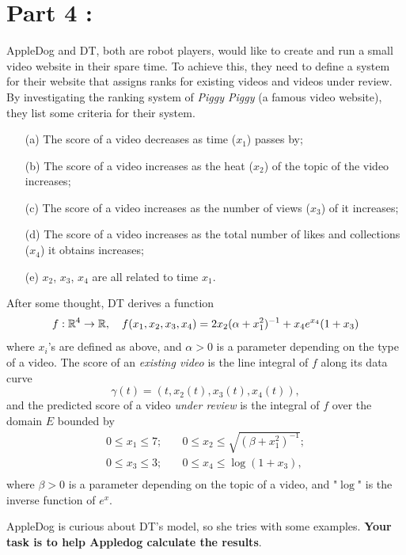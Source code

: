\documentclass[12pt]{article}
\renewcommand{\emph}[1]{{\color{Turquoise3}\textsl{#1}}}
\begin{document}
\section*{Part 4 : }
\par AppleDog and DT, both are robot players, would like to create and run a small video website in their spare time. To achieve this, they need to define a system for their website that assigns ranks for existing videos and videos under review. By investigating the ranking system of \textsl{Piggy Piggy} (a famous video website), they list some criteria for their system.
\begin{itemize}
    \item[(a)] The score of a video decreases as time (\emph{$x_1$}) passes by;
    \item[(b)] The score of a video increases as the heat (\emph{$x_2$}) of the topic of the video increases;
    \item[(c)] The score of a video increases as the number of views (\emph{$x_3$}) of it increases;
    \item[(d)] The score of a video increases as the total number of likes and collections (\emph{$x_4$}) it obtains increases;
    \item[(e)] $x_2$, $x_3$, $x_4$ are all related to time \emph{$x_1$}. 
\end{itemize}
\par After some thought, DT derives a function 
\begin{equation*}
    f:\mathbb{R}^4 \to \mathbb{R},\quad f(x_1, x_2, x_3, x_4) = 2 x_2(\alpha + x_1^2)^{-1} + x_4e^{x_4}(1 + x_3)
\end{equation*}
where $x_i$'s are defined as above, and $\alpha > 0$ is a parameter depending on the type of a video. The score of an \textsl{existing video} is the line integral of $f$ along its data curve
\begin{equation*}
    \gamma(t)=(t,x_2(t),x_3(t),x_4(t)), 
\end{equation*}
and the predicted score of a video \textsl{under review} is the integral of $f$ over the domain $E$ bounded by
\begin{equation*}
    \begin{split}
        0 \leq x_1\leq 7;& \quad 0 \leq x_2 \leq \sqrt{(\beta + x_1^2)^{-1}};\\
        0 \leq x_3 \leq 3;& \quad 0 \leq x_4 \leq \log(1 + x_3),\\ 
    \end{split}
\end{equation*}
where $\beta > 0$ is a parameter depending on the topic of a video, and "$\log$" is the inverse function of $e^x$.
\par AppleDog is curious about DT's model, so she tries with some examples. \textbf{Your task is to help Appledog calculate the results}. 
\end{document}
